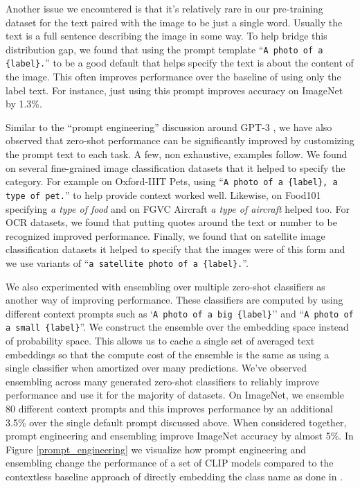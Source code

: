 \documentclass{article}
\begin{document}
Another issue we encountered is that it's relatively rare in our pre-training dataset for the text paired with the image to be just a single word. Usually the text is a full sentence describing the image in some way. To help bridge this distribution gap, we found that using the prompt template ``\texttt{A photo of a \{label\}.}'' to be a good default that helps specify the text is about the content of the image. This often improves performance over the baseline of using only the label text. For instance, just using this prompt improves accuracy on ImageNet by 1.3\%.



Similar to the ``prompt engineering'' discussion around GPT-3 \citep{brown2020language,gao2020making}, we have also observed that zero-shot performance can be significantly improved by customizing the prompt text to each task. A few, non exhaustive, examples follow. We found on several fine-grained image classification datasets that it helped to specify the category. For example on Oxford-IIIT Pets, using ``\texttt{A photo of a \{label\}, a type of pet.}'' to help provide context worked well. Likewise, on Food101 specifying \textit{a type of food} and on FGVC Aircraft \textit{a type of aircraft} helped too. For OCR datasets, we found that putting quotes around the text or number to be recognized improved performance. Finally, we found that on satellite image classification datasets it helped to specify that the images were of this form and we use variants of ``\texttt{a satellite photo of a \{label\}.}''.

We also experimented with ensembling over multiple zero-shot classifiers as another way of improving performance. These classifiers are computed by using different context prompts such as `\texttt{A photo of a big \{label\}}'' and ``\texttt{A photo of a small \{label\}}''. We construct the ensemble over the embedding space instead of probability space. This allows us to cache a single set of averaged text embeddings so that the compute cost of the ensemble is the same as using a single classifier when amortized over many predictions. We've observed ensembling across many generated zero-shot classifiers to reliably improve performance and use it for the majority of datasets. On ImageNet, we ensemble 80 different context prompts and this improves performance by an additional 3.5\% over the single default prompt discussed above. When considered together, prompt engineering and ensembling improve ImageNet accuracy by almost 5\%. In Figure \ref{prompt_engineering} we visualize how prompt engineering and ensembling change the performance of a set of CLIP models compared to the contextless baseline approach of directly embedding the class name as done in \citet{li2017learning}. 
\end{document}
